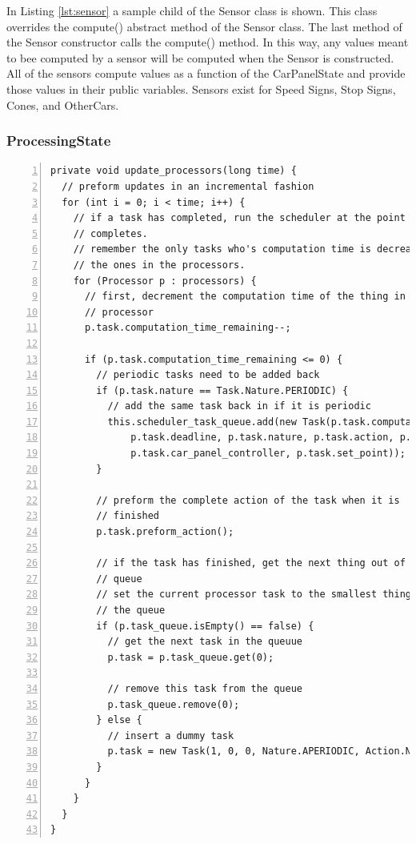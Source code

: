 \documentclass{article} %
\begin{document}
In Listing \ref{lst:sensor} a sample child of the Sensor class is shown.
This class overrides the compute() abstract method of the Sensor class. The last method of the Sensor constructor calls the compute() method.
In this way, any values meant to bee computed by a sensor will be computed when the Sensor is constructed.
All of the sensors compute values as a function of the CarPanelState and provide those values in their public variables.
Sensors exist for Speed Signs, Stop Signs, Cones, and OtherCars.

\subsubsection{ProcessingState}
\begin{lstlisting}[float=*,caption={Scheduler call and task queue manipulation},label={lst:ProcessingState},numbers=left]
private void update_processors(long time) {
  // preform updates in an incremental fashion
  for (int i = 0; i < time; i++) {
    // if a task has completed, run the scheduler at the point it
    // completes.
    // remember the only tasks who's computation time is decreasing are
    // the ones in the processors.
    for (Processor p : processors) {
      // first, decrement the computation time of the thing in this
      // processor
      p.task.computation_time_remaining--;

      if (p.task.computation_time_remaining <= 0) {
        // periodic tasks need to be added back
        if (p.task.nature == Task.Nature.PERIODIC) {
          // add the same task back in if it is periodic
          this.scheduler_task_queue.add(new Task(p.task.computation_time_origional, p.task.period,
              p.task.deadline, p.task.nature, p.task.action, p.task.processing_controller,
              p.task.car_panel_controller, p.task.set_point));
        }

        // preform the complete action of the task when it is
        // finished
        p.task.preform_action();

        // if the task has finished, get the next thing out of the
        // queue
        // set the current processor task to the smallest thing in
        // the queue
        if (p.task_queue.isEmpty() == false) {
          // get the next task in the queuue
          p.task = p.task_queue.get(0);

          // remove this task from the queue
          p.task_queue.remove(0);
        } else {
          // insert a dummy task
          p.task = new Task(1, 0, 0, Nature.APERIODIC, Action.NONE, null, null, 0);
        }
      }
    }
  }
}
\end{lstlisting}
\end{document}
